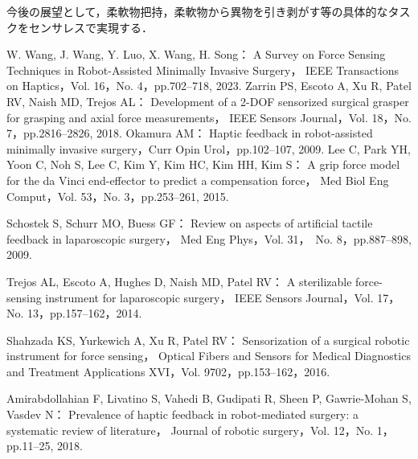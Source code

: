 \documentclass[a4paper]{jarticle}
\begin{document}
今後の展望として，柔軟物把持，柔軟物から異物を引き剥がす等の具体的なタスクをセンサレスで実現する\cite{future_work1}．
\begin{thebibliography}{9}
    \setlength{\itemsep}{0pt} %
    \renewcommand{\baselinestretch}{0.8}\selectfont %
    \setlength{\parskip}{0pt} %

    W. Wang, J. Wang, Y. Luo, X. Wang, H. Song：
    A Survey on Force Sensing Techniques in Robot-Assisted Minimally Invasive Surgery，
    IEEE Transactions on Haptics，Vol. 16，No. 4，pp.702–718, 2023.
    Zarrin PS, Escoto A, Xu R, Patel RV, Naish MD, Trejos AL： 
    Development of a 2-DOF sensorized surgical grasper for grasping and axial force measurements，
    IEEE Sensors Journal，Vol. 18，No. 7，pp.2816–2826, 2018.
    Okamura AM：
    Haptic feedback in robot-assisted minimally invasive surgery，Curr Opin Urol，pp.102–107, 2009.
    Lee C, Park YH, Yoon C, Noh S, Lee C, Kim Y, Kim HC, Kim HH, Kim S：
    A grip force model for the da Vinci end-effector to predict a compensation force，
    Med Biol Eng Comput，Vol. 53，No. 3，pp.253–261, 2015.

    Schostek S, Schurr MO, Buess GF：
    Review on aspects of artificial tactile feedback in laparoscopic surgery，
    Med Eng Phys，Vol. 31，　No. 8，pp.887–898, 2009.

    
    Trejos AL, Escoto A, Hughes D, Naish MD, Patel RV：
    A sterilizable force-sensing instrument for laparoscopic surgery，
    IEEE Sensors Journal，Vol. 17，No. 13，pp.157–162，2014.

    Shahzada KS, Yurkewich A, Xu R, Patel RV：
    Sensorization of a surgical robotic instrument for force sensing，
    Optical Fibers and Sensors for Medical Diagnostics and Treatment Applications XVI，Vol. 9702，pp.153–162，2016.
    

    
    Amirabdollahian F, Livatino S, Vahedi B, Gudipati R, Sheen P, Gawrie-Mohan S, Vasdev N：
    Prevalence of haptic feedback in robot-mediated surgery: a systematic review of literature，
    Journal of robotic surgery，Vol. 12，No. 1，pp.11–25, 2018.


\end{thebibliography}
\end{document}
